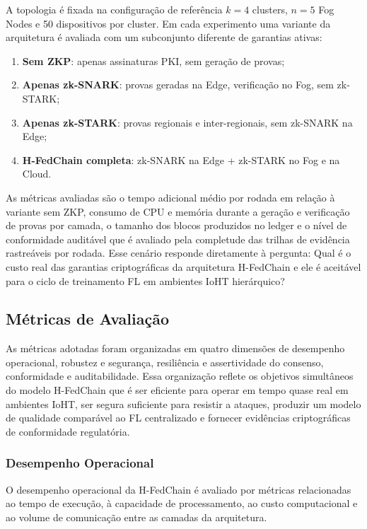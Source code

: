 \documentclass[12pt]{article}
\begin{document}
A topologia é fixada na configuração de referência $k = 4$ clusters, $n = 5$ Fog Nodes e 50 dispositivos por cluster. Em cada experimento uma variante da arquitetura é avaliada com um subconjunto diferente de garantias ativas:
\begin{enumerate}
\item \textbf{Sem ZKP}: apenas assinaturas PKI, sem geração de provas;
\item \textbf{Apenas zk-SNARK}: provas geradas na Edge, verificação no
Fog, sem zk-STARK;
\item \textbf{Apenas zk-STARK}: provas regionais e inter-regionais,
sem zk-SNARK na Edge;
\item \textbf{H-FedChain completa}: zk-SNARK na Edge + zk-STARK no Fog
e na Cloud.
\end{enumerate}

As métricas avaliadas são o tempo adicional médio por rodada em relação à variante sem ZKP, consumo de CPU e memória durante a geração e verificação de provas por camada, o tamanho dos blocos produzidos no ledger e o nível de conformidade auditável que é avaliado pela completude das trilhas de evidência rastreáveis por rodada. Esse cenário responde diretamente à pergunta: Qual é o custo real das garantias criptográficas da arquitetura H-FedChain e ele é aceitável para o ciclo de treinamento FL em ambientes IoHT hierárquico?

\subsection{Métricas de Avaliação}
\label{sec:metricas}

As métricas adotadas foram organizadas em quatro dimensões de desempenho operacional, robustez e segurança, resiliência e assertividade do consenso, conformidade e auditabilidade. Essa organização reflete os objetivos simultâneos do modelo H-FedChain que é ser eficiente para operar em tempo quase real em ambientes IoHT, ser segura suficiente para resistir a ataques, produzir um modelo de qualidade comparável ao FL centralizado e fornecer evidências criptográficas de conformidade regulatória.

\subsubsection{Desempenho Operacional}

O desempenho operacional da H-FedChain é avaliado por métricas relacionadas ao tempo de execução, à capacidade de processamento, ao custo computacional e ao volume de comunicação entre as camadas da arquitetura.
\end{document}
